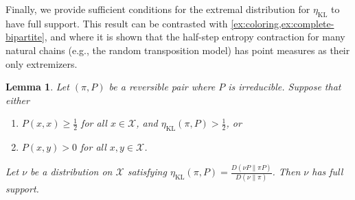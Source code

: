 \documentclass[11pt]{article}
\def\cX{\mathcal{X}}
\DeclareMathOperator\KL{\mathrm{KL}}
\newcommand{\nbyp}[1]{{\color{red}[Yury: #1]}}
\newcommand{\yuzhou}[1]{{\color{blue}[Yuzhou: #1]}}
\newtheorem{lemma}[theorem]{Lemma}
\theoremstyle{definition}
\begin{document}

Finally, we provide sufficient conditions for the extremal distribution for $\eta_{\KL}$ to have full support. This result can be contrasted with \cref{ex:coloring,ex:complete-bipartite}, and \cite{bristiel2024entropy} where it is shown that the half-step entropy contraction for many natural chains (e.g., the random transposition model) has point measures as their only extremizers.
\begin{lemma} \label{lem:delta-extremal-full-supp}
  Let $(\pi, P)$ be a reversible pair where $P$ is irreducible.
  Suppose that either
  \begin{enumerate}[label=(\roman*)]
    \item \label{item:lem-delta-extremal-full-supp:i} $P(x,x)\ge \frac 12$ for all $x\in \cX$, and $\eta_{\KL}(\pi, P) > \frac 12$, or
    \item \label{item:lem-delta-extremal-full-supp:ii} $P(x,y) > 0$ for all $x,y\in \cX$.
  \end{enumerate}
  Let $\nu$ be a distribution on $\cX$ satisfying $\eta_{\KL}(\pi, P) = \frac{D(\nu P \| \pi P)}{D(\nu \| \pi)}$.
  Then $\nu$ has full support.
\end{lemma}
\end{document}
